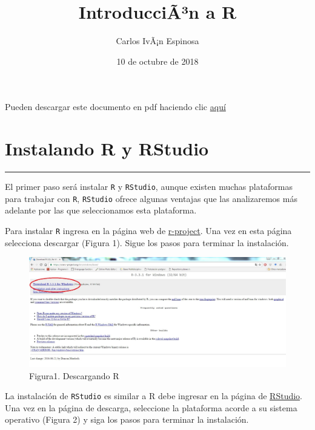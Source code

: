 \documentclass[]{article}
\title{IntroducciÃ³n a R}
\author{Carlos IvÃ¡n Espinosa}
\date{10 de octubre de 2018}
\begin{document}
\maketitle

{
\setcounter{tocdepth}{2}
\tableofcontents
}
Pueden descargar este documento en pdf haciendo clic
\href{https://github.com/Ciespinosa/IntroduccionR/blob/master/index.pdf}{aquí}

\section{Instalando R y RStudio}\label{instalando-r-y-rstudio}

\begin{center}\rule{0.5\linewidth}{\linethickness}\end{center}

El primer paso será instalar \texttt{R} y \texttt{RStudio}, aunque
existen muchas plataformas para trabajar con \texttt{R},
\texttt{RStudio} ofrece algunas ventajas que las analizaremos más
adelante por las que seleccionamos esta plataforma.

Para instalar \texttt{R} ingresa en la página web de
\href{https://cran.r-project.org/bin/windows/base/}{r-project}. Una vez
en esta página selecciona descargar (Figura 1). Sigue los pasos para
terminar la instalación.

\begin{figure}[htbp]
\centering
\includegraphics{imagen/descargarR.jpg}
\caption{Figura1. Descargando R}
\end{figure}

La instalación de \texttt{RStudio} es similar a R debe ingresar en la
página de
\href{https://www.rstudio.com/products/rstudio/download/}{RStudio}. Una
vez en la página de descarga, seleccione la plataforma acorde a su
sistema operativo (Figura 2) y siga los pasos para terminar la
instalación.
\end{document}
